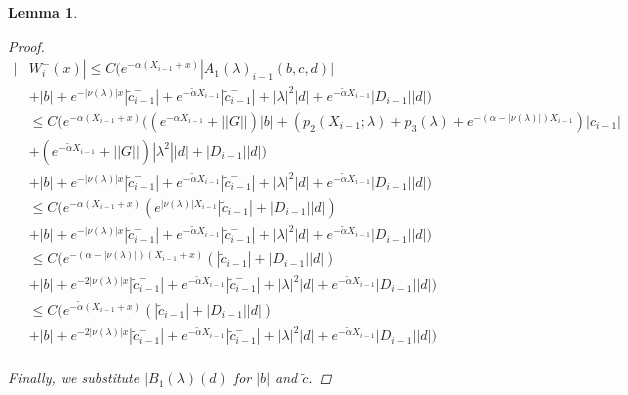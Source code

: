 \documentclass[12pt]{article}
\newtheorem{lemma}{Lemma}
\begin{document}
\begin{lemma}
\begin{proof}
\begin{align*}
| &W_i^-(x)| \leq C \Big(e^{-\alpha(X_{i-1} + x)}|A_1(\lambda)_{i-1}(b, c, d)| \\
&+ |b| + e^{-|\nu(\lambda)|x} |\tilde{c}_{i-1}^-| + e^{-\tilde{\alpha} X_{i-1}} |\tilde{c}_{i-1}^-| + |\lambda|^2 |d| + e^{-\tilde{\alpha} X_{i-1}} |D_{i-1}||d| \Big) \\
&\leq C \Big(e^{-\alpha(X_{i-1} + x)}( (e^{-\alpha X_{i-1}} + ||G||) |b| + ( p_2(X_{i-1}; \lambda) + p_3(\lambda) + e^{-(\alpha - |\nu(\lambda)|)X_{i-1}} )|c_{i-1}| \\
&+ (e^{-\tilde{\alpha} X_{i-1}} + ||G||) |\lambda^2| |d| + |D_{i-1}||d| ) \\
&+ |b| + e^{-|\nu(\lambda)|x} |\tilde{c}_{i-1}^-| + e^{-\tilde{\alpha} X_{i-1}} |\tilde{c}_{i-1}^-| + |\lambda|^2 |d| + e^{-\tilde{\alpha} X_{i-1}} |D_{i-1}||d| \Big) \\
&\leq C \Big(e^{-\alpha(X_{i-1} + x)}( e^{|\nu(\lambda)|X_{i-1}} |\tilde{c}_{i-1}| + |D_{i-1}||d| ) \\
&+ |b| + e^{-|\nu(\lambda)|x} |\tilde{c}_{i-1}^-| + e^{-\tilde{\alpha} X_{i-1}} |\tilde{c}_{i-1}^-| + |\lambda|^2 |d| + e^{-\tilde{\alpha} X_{i-1}} |D_{i-1}||d| \Big) \\
&\leq C \Big(e^{-(\alpha - |\nu(\lambda)|)(X_{i-1} + x)}( |\tilde{c}_{i-1}| + |D_{i-1}||d| ) \\
&+ |b| + e^{-2 |\nu(\lambda)|x} |\tilde{c}_{i-1}^-| + e^{-\tilde{\alpha} X_{i-1}} |\tilde{c}_{i-1}^-| + |\lambda|^2 |d| + e^{-\tilde{\alpha} X_{i-1}} |D_{i-1}||d| \Big) \\
&\leq C \Big(e^{-\tilde{\alpha}(X_{i-1} + x)}( |\tilde{c}_{i-1}| + |D_{i-1}||d| ) \\
&+ |b| + e^{-2 |\nu(\lambda)|x} |\tilde{c}_{i-1}^-| + e^{-\tilde{\alpha} X_{i-1}} |\tilde{c}_{i-1}^-| + |\lambda|^2 |d| + e^{-\tilde{\alpha} X_{i-1}} |D_{i-1}||d| \Big) \\
\end{align*}

Finally, we substitute $|B_1(\lambda)(d)$ for $|b|$ and $\tilde{c}$.


\end{proof}
\end{lemma}
\end{document}
